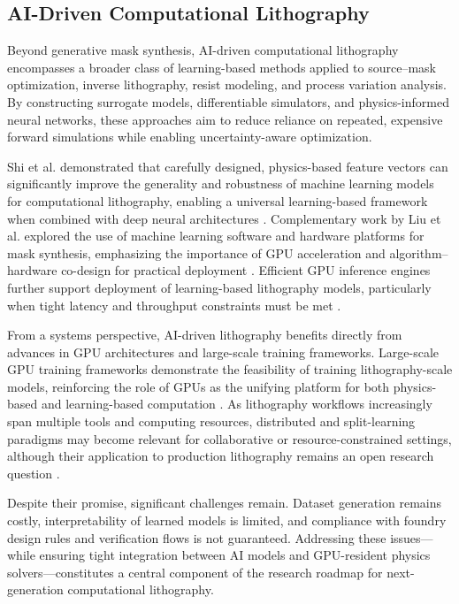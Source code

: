 \documentclass[pdflatex,sn-mathphys-num]{sn-jnl}%
\theoremstyle{thmstyleone}%
\theoremstyle{thmstyletwo}%
\theoremstyle{thmstylethree}%
\begin{document}
\subsection{AI-Driven Computational Lithography}
Beyond generative mask synthesis, AI-driven computational lithography encompasses a broader class of learning-based methods applied to source–mask optimization, inverse lithography, resist modeling, and process variation analysis. By constructing surrogate models, differentiable simulators, and physics-informed neural networks, these approaches aim to reduce reliance on repeated, expensive forward simulations while enabling uncertainty-aware optimization.

Shi et al. demonstrated that carefully designed, physics-based feature vectors can significantly improve the generality and robustness of machine learning models for computational lithography, enabling a universal learning-based framework when combined with deep neural architectures \cite{shi2020ai}. Complementary work by Liu et al. explored the use of machine learning software and hardware platforms for mask synthesis, emphasizing the importance of GPU acceleration and algorithm–hardware co-design for practical deployment \cite{liu2020mask}. Efficient GPU inference engines further support deployment of learning-based lithography models, particularly when tight latency and throughput constraints must be met \cite{PhoneBit2019}.

From a systems perspective, AI-driven lithography benefits directly from advances in GPU architectures and large-scale training frameworks. Large-scale GPU training frameworks demonstrate the feasibility of training lithography-scale models, reinforcing the role of GPUs as the unifying platform for both physics-based and learning-based computation \cite{HugeCTR2022}. As lithography workflows increasingly span multiple tools and computing resources, distributed and split-learning paradigms may become relevant for collaborative or resource-constrained settings, although their application to production lithography remains an open research question \cite{Lin2024SplitLearning}.

Despite their promise, significant challenges remain. Dataset generation remains costly, interpretability of learned models is limited, and compliance with foundry design rules and verification flows is not guaranteed. Addressing these issues—while ensuring tight integration between AI models and GPU-resident physics solvers—constitutes a central component of the research roadmap for next-generation computational lithography.
\end{document}
